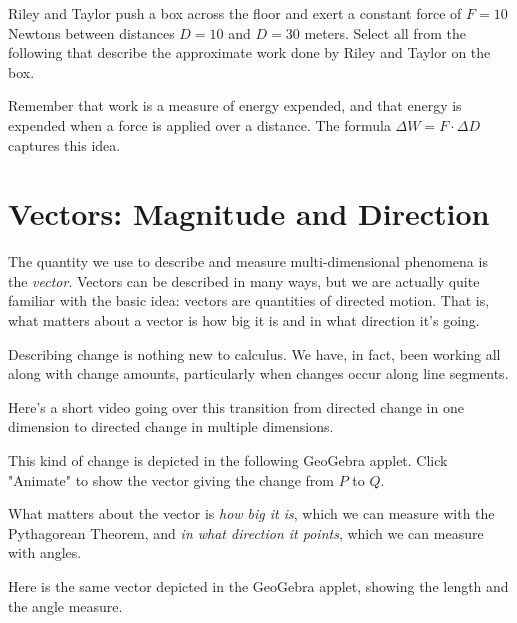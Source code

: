 \documentclass{ximera}
\begin{document}
\begin{problem}
Riley and Taylor push a box across the floor and exert a constant force of $F=10$ Newtons between distances $D=10$ and $D=30$ meters. Select all from the following that describe the approximate work done by Riley and Taylor on the box.

\begin{selectAll}
\end{selectAll}
\begin{feedback}
Remember that work is a measure of energy expended, and that energy is expended when a force is applied over a distance. The formula $\Delta W=F\cdot \Delta D$ captures this idea.
\end{feedback}
\end{problem}


\section{Vectors: Magnitude and Direction}

The quantity we use to describe and measure multi-dimensional phenomena is the \emph{vector}. Vectors can be described in many ways, but we are actually quite familiar with the basic idea: vectors are quantities of directed motion. That is, what matters about a vector is how big it is and in what direction it's going.

Describing change is nothing new to calculus. We have, in fact, been working all along with change amounts, particularly when changes occur along line segments. 

Here's a short video going over this transition from directed change in one dimension to directed change in multiple dimensions.


This kind of change is depicted in the following GeoGebra applet. Click "Animate" to show the vector giving the change from $P$ to $Q$.

\begin{center}
\end{center}

What matters about the vector is \emph{how big it is}, which we can measure with the Pythagorean Theorem, and \emph{in what direction it points}, which we can measure with angles.

Here is the same vector depicted in the GeoGebra applet, showing the length and the angle measure. 
\end{document}
